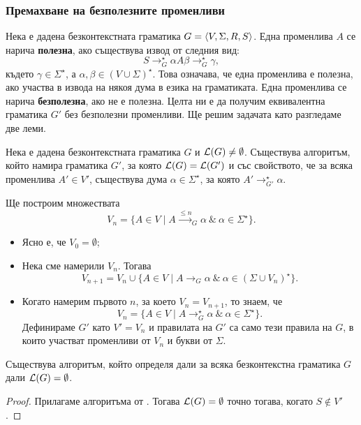 \subsubsection*{Премахване на безполезните променливи}

Нека е дадена безконтекстната граматика $G = \langle{V,\Sigma,R,S}\rangle$.
Една променлива $A$ се нарича {\bf полезна}, ако съществува извод от следния вид:
\[S \to^\star_G \alpha A \beta \to^\star_G \gamma,\]
където $\gamma \in \Sigma^\star$, а $\alpha,\beta \in (V \cup \Sigma)^\star$.
Това означава, че една променлива е полезна, ако участва в извода на някоя дума в езика на граматиката.
Една променлива се нарича {\bf безполезна}, ако не е полезна.
Целта ни е да получим еквивалентна граматика $G'$ без безполезни променливи.
Ще решим задачата като разгледаме две леми.

\begin{lemma}
  \label{lem:useless1}
  Нека е дадена безконтекстната граматика $G$ и $\mathcal{L}(G) \neq \emptyset$.
  Съществува алгоритъм, който намира граматика $G'$, за която
  $\mathcal{L}(G) = \mathcal{L}(G')$ и със свойството, че  за всяка променлива $A' \in V'$, съществува дума $\alpha \in \Sigma^\star$,
  за която $A' \to^\star_{G'} \alpha$.
\end{lemma}
\begin{hint}
  Ще построим множествата
  \[V_n = \{A \in V \mid A \stackrel{\leq n}{\to}_G \alpha\ \&\ \alpha\in\Sigma^\star\}.\]

  \begin{itemize}
  \item
    Ясно е, че $V_0 = \emptyset$;
  \item
    Нека сме намерили $V_n$. Тогава
    \[V_{n+1} = V_n \cup \{A\in V \mid A \to_G \alpha\ \&\ \alpha \in (\Sigma \cup V_n)^\star \}.\]
  \item
    Когато намерим първото $n$, за което $V_n = V_{n+1}$,
    то знаем, че
    \[V_n = \{A \in V \mid A \to^\star_G \alpha\ \&\ \alpha \in \Sigma^\star \}.\]
    Дефинираме $G'$ като $V' = V_n$ и правилата на $G'$ са само тези правила на $G$, в които участват променливи от $V_n$ и букви от $\Sigma$.
  \end{itemize}
\end{hint}

\begin{cor}
  Съществува алгоритъм, който определя дали за всяка безконтекстна граматика $G$ дали $\mathcal{L}(G) = \emptyset$.
\end{cor}
\begin{proof}
  Прилагаме алгоритъма от .
  Тогава $\mathcal{L}(G) = \emptyset$ точно тогава, когато $S \not\in V'$.  
\end{proof}


